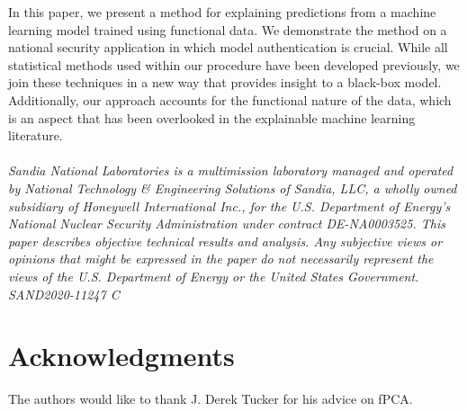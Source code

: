 \documentclass[letterpaper]{article}
\begin{document}
In this paper, we present a method for explaining predictions from a machine learning model trained using functional data. We demonstrate the method on a national security application in which model authentication is crucial. While all statistical methods used within our procedure have been developed previously, we join these techniques in a new way that provides insight to a black-box model. Additionally, our approach accounts for the functional nature of the data, which is an aspect that has been overlooked in the explainable machine learning literature.\\
\\
\textit{Sandia National Laboratories is a multimission laboratory managed and operated by National Technology \& Engineering Solutions of Sandia, LLC, a wholly owned subsidiary of Honeywell International Inc., for the U.S. Department of Energy's National Nuclear Security Administration under contract DE-NA0003525. This paper describes objective technical results and analysis. Any subjective views or opinions that might be expressed in the paper do not necessarily represent the views of the U.S. Department of Energy or the United States Government. SAND2020-11247 C}

\section*{Acknowledgments}

The authors would like to thank J. Derek Tucker for his advice on fPCA.



\end{document}
